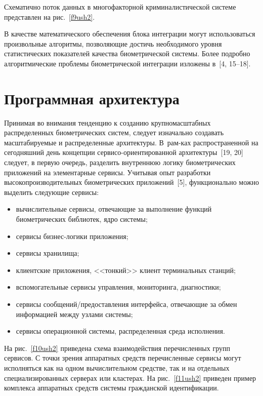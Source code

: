 \begin{multicols}{2}  

  Схематично поток данных в многофакторной криминалистической системе 
представлен на рис.~\ref{f9ush2}. 
  
 
  В качестве математического обеспечения блока интеграции могут 
использоваться произвольные алгоритмы, позволяющие достичь необходимого 
уровня статистических показателей качества биометрической системы. Более 
подробно алгоритмические проблемы биометрической интеграции изложены 
в~[4, 15--18].
  
\vspace*{-6pt}
  \section{Программная архитектура}
  
  Принимая во внимания тенденцию к созданию крупномасштабных 
распределенных био\-мет\-ри\-че\-ских систем, следует изначально создавать 
масштабируемые и распределенные архитектуры. В~рам-\linebreak ках распространенной 
на сегодняшний день концепции сер\-ви\-со-ори\-ен\-ти\-ро\-ван\-ной 
  архитектуры~[19, 20] следует, в первую очередь, разделить внутреннюю 
логику биометрических приложений на элементарные сервисы. Учитывая опыт 
разработки высо\-ко\-про\-из\-во\-ди\-тель\-ных биометрических приложений~[5], 
функционально можно выделить сле\-ду\-ющие сервисы:
\begin{itemize}
\item вычислительные сервисы, отвечающие за выполнение функций 
биометрических библиотек, ядро системы;
\item сервисы бизнес-логики приложения;
\item сервисы хранилища;
\item клиентские приложения, <<тонкий>> клиент терминальных 
станций;
\item вспомогательные сервисы управления, мониторинга, 
диагностики;
\item сервисы сообщений/предоставления интерфейса, отвечающие 
за обмен информацией между узлами системы;
\item сервисы операционной системы, распределенная среда 
исполнения.
\end{itemize}
  
   
  На рис.~\ref{f10ush2} приведена схема взаимодействия перечисленных групп 
сервисов. С точки зрения аппаратных средств перечисленные сервисы могут 
исполняться как на одном вычислительном средстве, так и на отдельных 
специализированных серверах или кластерах. На рис.~\ref{f11ush2} приведен 
пример комплекса аппаратных средств системы гражданской идентификации.

  \end{multicols}
  
